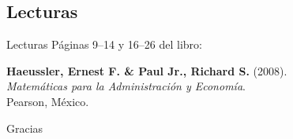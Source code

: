 \documentclass[10pt,handout,aspectratio=169]{beamer}
\begin{document}
	\subsection{Lecturas}
	
	\begin{frame}{Lecturas}
		Páginas 9--14 y 16--26 del libro:
		
		\bigskip
		
		\textbf{Haeussler, Ernest F. \& Paul Jr., Richard S.} (2008).\\
		\emph{Matemáticas para la Administración y Economía}.\\
		Pearson, México.
	\end{frame}
	
	\begin{frame}
		\centering
		\Huge Gracias
	\end{frame}
	
\end{document}
